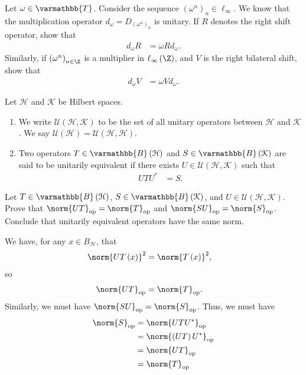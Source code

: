 \documentclass[10pt]{mypackage}
\renewcommand*{\mathbb}[1]{\varmathbb{#1}}
\newcommand{\B}{\mathbb{B}}
\begin{document}
\begin{exercise}
  Let $\omega\in \mathbb{T}$. Consider the sequence $\left(\omega^n\right)_n\in \ell_{\infty}$. We know that the multiplication operator $d_{\omega} = D_{\left(\omega^n\right)_n}$ is unitary. If $R$ denotes the right shift operator, show that
  \begin{align*}
    d_\omega R &= \omega R d_{\omega}.
  \end{align*}
  Similarly, if $\left(\omega^n\right)_{n\in \Z}$ is a multiplier in $\ell_{\infty}\left(\Z\right)$, and $V$ is the right bilateral shift, show that
  \begin{align*}
    d_{\omega}V &= \omega V d_{\omega}.
  \end{align*}
\end{exercise}
\begin{definition}
  Let $\mathcal{H}$ and $\mathcal{K}$ be Hilbert spaces.
  \begin{enumerate}[(1)]
    \item We write $\mathcal{U}\left(\mathcal{H},\mathcal{K}\right)$ to be the set of all unitary operators between $\mathcal{H}$ and $\mathcal{K}$. We say $\mathcal{U}\left(\mathcal{H}\right) = \mathcal{U}\left(\mathcal{H},\mathcal{H}\right)$.
    \item Two operators $T\in \B\left(\mathcal{H}\right)$ and $S\in \B\left(\mathcal{K}\right)$ are said to be unitarily equivalent if there exists $U\in \mathcal{U}\left(\mathcal{H},\mathcal{K}\right)$ such that
      \begin{align*}
        UTU^{\ast} &= S.
      \end{align*}
  \end{enumerate}
\end{definition}
\begin{exercise}
  Let $T\in \B\left(\mathcal{H}\right)$, $S\in \B\left(\mathcal{K}\right)$, and $U\in \mathcal{U}\left(\mathcal{H},\mathcal{K}\right)$. Prove that $\norm{UT}_{\text{op}} = \norm{T}_{\text{op}}$ and $\norm{SU}_{\text{op}} = \norm{S}_{\text{op}}$. Conclude that unitarily equivalent operators have the same norm.
\end{exercise}
\begin{solution}
  We have, for any $x\in B_{\mathcal{H}}$, that
  \begin{align*}
    \norm{UT\left(x\right)}^2 &= \norm{T\left(x\right)}^2,
  \end{align*}
  so
  \begin{align*}
    \norm{UT}_{\text{op}} &= \norm{T}_{\text{op}}.
  \end{align*}
  Similarly, we must have $\norm{SU}_{\text{op}} = \norm{S}_{\text{op}}$. Thus, we must have
  \begin{align*}
    \norm{S}_{\text{op}} &= \norm{UTU^{\ast}}_{\text{op}}\\
                         &= \norm{\left(UT\right)U^{\ast}}_{\text{op}}\\
                                  &= \norm{UT}_{\text{op}}\\
                                  &= \norm{T}_{\text{op}}
  \end{align*}
\end{solution}
\end{document}
